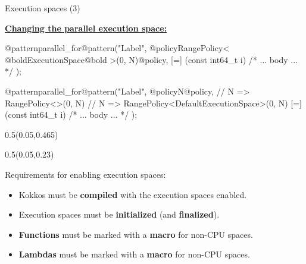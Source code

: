 
\begin{frame}[fragile]{Execution spaces (3)}

  \textbf{\ul{Changing the parallel execution space:}}

  \vspace{3pt}

  \begin{code}[linebackgroundcolor={
        \btLstHL<1->{4}{bodyColor}
      },
      frame=single
    ]
@patternparallel_for@pattern("Label", @policyRangePolicy< @boldExecutionSpace@bold >(0, N)@policy,
  [=] (const int64_t i) {
    /* ... body ... */
  });
  \end{code}

  \begin{code}[linebackgroundcolor={
        \btLstHL<1->{4}{bodyColor}
      },
      frame=single
    ]
@patternparallel_for@pattern("Label", @policyN@policy,
    // N => RangePolicy<>(0, N)
    // N => RangePolicy<DefaultExecutionSpace>(0, N)
  [=] (const int64_t i) {
    /* ... body ... */
  });
  \end{code}

  \begin{textblock*}{0.5\textwidth}(0.05\textwidth,0.465\textheight)
  \end{textblock*}

  \begin{textblock*}{0.5\textwidth}(0.05\textwidth,0.23\textheight)
  \end{textblock*}

  \pause

  Requirements for enabling execution spaces:
  \vspace{-3pt}
  \begin{itemize}
    \item{Kokkos must be \textbf{compiled} with the execution spaces enabled.}
    \item{Execution spaces must be \textbf{initialized} (and \textbf{finalized}).}
    \item{\textbf{Functions} must be marked with a \textbf{macro} for non-CPU spaces.}
    \item{\textbf{Lambdas} must be marked with a \textbf{macro} for non-CPU spaces.}
  \end{itemize}

\end{frame}

